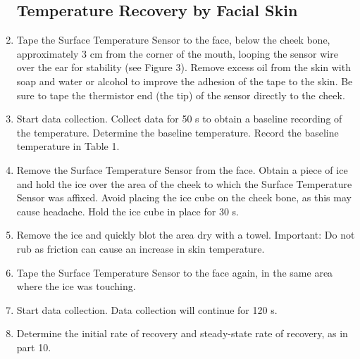 \documentclass[12pt,oneside]{article}
\begin{document}
\begin{enumerate}
\subsection{Temperature Recovery by Facial Skin}
\item	Tape the Surface Temperature Sensor to the face, below the cheek bone, approximately 3 cm from the corner of the mouth, looping the sensor wire over the ear for stability (see Figure 3). Remove excess oil from the skin with soap and water or alcohol to improve the adhesion of the tape to the skin. Be sure to tape the thermistor end (the tip) of the sensor directly to the cheek. 
\item	Start data collection. Collect data for 50 s to obtain a baseline recording of the temperature. Determine the baseline temperature. Record the baseline temperature in Table 1.
\item	Remove the Surface Temperature Sensor from the face. Obtain a piece of ice and hold the ice over the area of the cheek to which the Surface Temperature Sensor was affixed. Avoid placing the ice cube on the cheek bone, as this may cause headache. Hold the ice cube in place for 30 s.
\item	Remove the ice and quickly blot the area dry with a towel. Important: Do not rub as friction can cause an increase in skin temperature.
\item	Tape the Surface Temperature Sensor to the face again, in the same area where the ice was touching.
\item	Start data collection. Data collection will continue for 120 s.
\item	Determine the initial rate of recovery and steady-state rate of recovery, as in part 10.

\end{enumerate}
\end{document}

